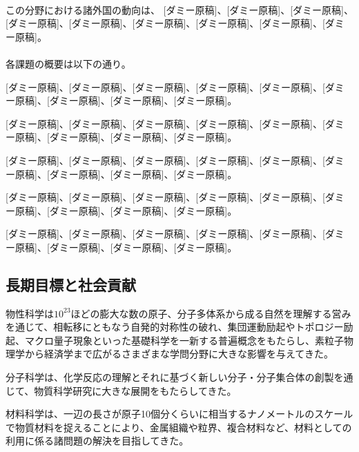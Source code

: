 \paragraph{}
この分野における諸外国の動向は、
[ダミー原稿]、[ダミー原稿]、[ダミー原稿]、[ダミー原稿]、[ダミー原稿]、[ダミー原稿]、[ダミー原稿]、[ダミー原稿]、[ダミー原稿]。

\paragraph{}
各課題の概要は以下の通り。

[ダミー原稿]、[ダミー原稿]、[ダミー原稿]、[ダミー原稿]、[ダミー原稿]、[ダミー原稿]、[ダミー原稿]、[ダミー原稿]、[ダミー原稿]。

[ダミー原稿]、[ダミー原稿]、[ダミー原稿]、[ダミー原稿]、[ダミー原稿]、[ダミー原稿]、[ダミー原稿]、[ダミー原稿]、[ダミー原稿]。

[ダミー原稿]、[ダミー原稿]、[ダミー原稿]、[ダミー原稿]、[ダミー原稿]、[ダミー原稿]、[ダミー原稿]、[ダミー原稿]、[ダミー原稿]。

[ダミー原稿]、[ダミー原稿]、[ダミー原稿]、[ダミー原稿]、[ダミー原稿]、[ダミー原稿]、[ダミー原稿]、[ダミー原稿]、[ダミー原稿]。

[ダミー原稿]、[ダミー原稿]、[ダミー原稿]、[ダミー原稿]、[ダミー原稿]、[ダミー原稿]、[ダミー原稿]、[ダミー原稿]、[ダミー原稿]。


\subsection{長期目標と社会貢献}
物性科学は$10^{23}$ほどの膨大な数の原子、分子多体系から成る自然を理解する営みを通じて、相転移にともなう自発的対称性の破れ、集団運動励起やトポロジー励起、マクロ量子現象といった基礎科学を一新する普遍概念をもたらし、素粒子物理学から経済学まで広がるさまざまな学問分野に大きな影響を与えてきた。

分子科学は、化学反応の理解とそれに基づく新しい分子・分子集合体の創製を通じて、物質科学研究に大きな展開をもたらしてきた。

材料科学は、一辺の長さが原子10個分くらいに相当するナノメートルのスケールで物質材料を捉えることにより、金属組織や粒界、複合材料など、材料としての利用に係る諸問題の解決を目指してきた。

